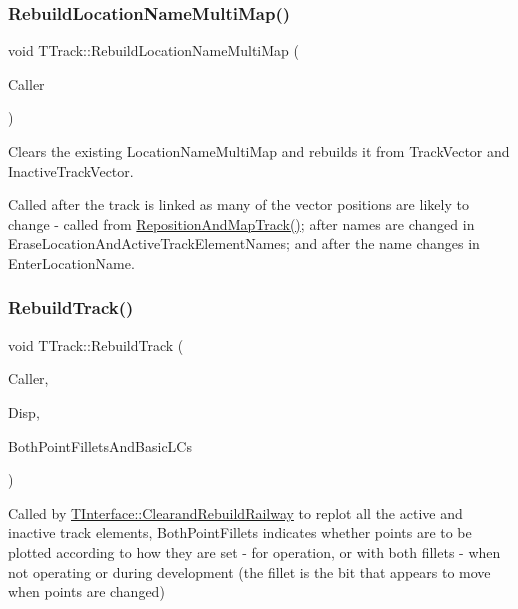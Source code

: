 \subsubsection{\texorpdfstring{Rebuild\+Location\+Name\+Multi\+Map()}{RebuildLocationNameMultiMap()}}
{\footnotesize\ttfamily void T\+Track\+::\+Rebuild\+Location\+Name\+Multi\+Map (\begin{DoxyParamCaption}\item[{int}]{Caller }\end{DoxyParamCaption})}

Clears the existing Location\+Name\+Multi\+Map and rebuilds it from Track\+Vector and Inactive\+Track\+Vector.

Called after the track is linked as many of the vector positions are likely to change -\/ called from \mbox{\hyperlink{class_t_track_a5e2e215fae5247206220d301c324e9a0}{Reposition\+And\+Map\+Track()}}; after names are changed in Erase\+Location\+And\+Active\+Track\+Element\+Names; and after the name changes in Enter\+Location\+Name. \mbox{\label{class_t_track_afbd25aa0deb973061c8500a4509136e0}} 
\subsubsection{\texorpdfstring{Rebuild\+Track()}{RebuildTrack()}}
{\footnotesize\ttfamily void T\+Track\+::\+Rebuild\+Track (\begin{DoxyParamCaption}\item[{int}]{Caller,  }\item[{\mbox{\hyperlink{class_t_display}{T\+Display}} $\ast$}]{Disp,  }\item[{bool}]{Both\+Point\+Fillets\+And\+Basic\+L\+Cs }\end{DoxyParamCaption})}

Called by \mbox{\hyperlink{class_t_interface_aaa05ac95703a25e1fb4863779854967c}{T\+Interface\+::\+Clearand\+Rebuild\+Railway}} to replot all the active and inactive track elements, Both\+Point\+Fillets indicates whether points are to be plotted according to how they are set -\/ for operation, or with both fillets -\/ when not operating or during development (the fillet is the bit that appears to move when points are changed) \mbox{\label{class_t_track_a5e2e215fae5247206220d301c324e9a0}} 
